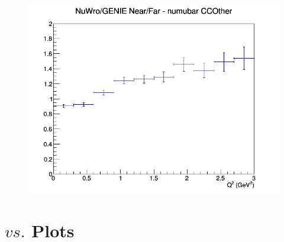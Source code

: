 \documentclass[12pt]{article}
\begin{document}
\begin{figure}[h]
\endminipage
{}
\includegraphics[width=\linewidth]{eff_Q2/GAr/ratios/CCOther_NuWro_GENIE_numubar_NF_Q2.png}
\endminipage
\newline
\end{figure}
\clearpage

\newpage
\newpage
\section{$ vs. $ Plots}
\end{document}
